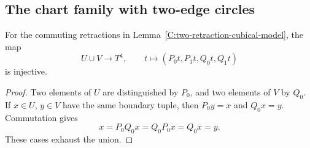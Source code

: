 \subsection{The chart family with two-edge circles}

\begin{lemma}
\label{C:retraction-boundary-injective}
For the commuting retractions in
Lemma~\ref{C:two-retraction-cubical-model}, the map
\[
 U\cup V\longrightarrow T^4,\qquad
 t\longmapsto(P_0t,P_1t,Q_0t,Q_1t)
\]
is injective.
\end{lemma}
\begin{proof}
Two elements of $U$ are distinguished by $P_0$, and two
elements of $V$ by $Q_0$.  If $x\in U$, $y\in V$ have the
same boundary tuple, then $P_0y=x$ and $Q_0x=y$.
Commutation gives
\[
 x=P_0Q_0x=Q_0P_0x=Q_0x=y.
\]
These cases exhaust the union.
\end{proof}

